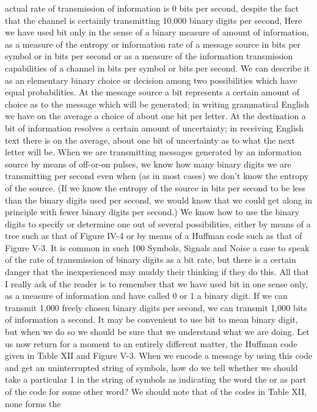 {{{actual rate of transmission of information is 0 bits per second,
despite the fact that the channel is certainly transmitting 10,000
binary digits per second,
Here we have used bit only in the sense of a binary measure of
amount of information, as a measure of the entropy or information
rate of a message source in bits per symbol or in bits per second
or as a measure of the information transmission capabilities of a
channel in bits per symbol or bits per second. We can describe it
as an elementary binary choice or decision among two possibilities
which have equal probabilities. At the message source a bit represents
a certain amount of choice as to the message which will be
generated; in writing grammatical English we have on the average
a choice of about one bit per letter. At the destination a bit of
information resolves a certain amount of uncertainty; in receiving
English text there is on the average, about one bit of uncertainty
as to what the next letter will be.
When we are transmitting messages generated by an information
source by means of off-or-on pulses, we know how many binary
digits we are transmitting per second even when (as in most cases)
we don’t know the entropy of the source. (If we know the entropy
of the source in bits per second to be less than the binary digits
used per second, we would know that we could get along in principle
with fewer binary digits per second.) We know how to use the
binary digits to specify or determine one out of several possibilities,
either by means of a tree such as that of Figure IV-4 or by means
of a Huffman code such as that of Figure V-3. It is common in such
100
Symbols, Signals and Noise
a case to speak of the rate of transmission of binary digits as a bit
rate, but there is a certain danger that the inexperienced may
muddy their thinking if they do this.
All that I really ask of the reader is to remember that we have
used bit in one sense only, as a measure of information and have
called 0 or 1 a binary digit. If we can transmit 1,000 freely chosen
binary digits per second, we can transmit 1,000 bits of information
a second. It may be convenient to use bit to mean binary digit, but
when we do so we should be sure that we understand what we
are doing.
Let us now return for a moment to an entirely different matter,
the Huffman code given in Table XII and Figure V-3. When we
encode a message by using this code and get an uninterrupted
string of symbols, how do we tell whether we should take a particular
1 in the string of symbols as indicating the word the or as part
of the code for some other word?
We should note that of the codes in Table XII, none forms the
}}}
